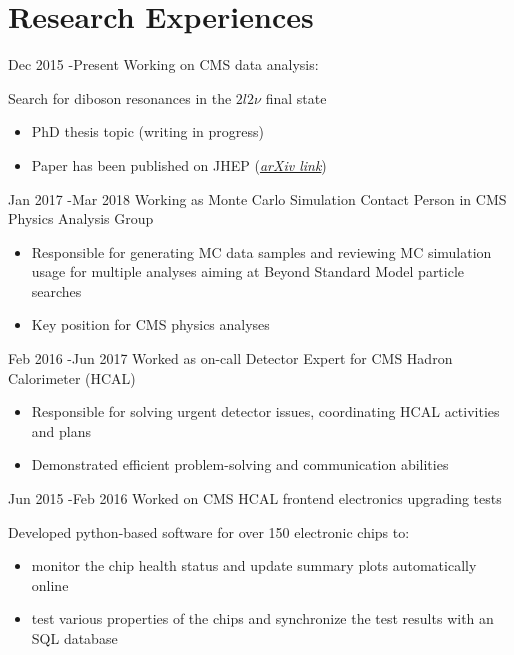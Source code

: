 \documentclass[10pt]{article} %
\begin{document}
\section{Research Experiences}
\job
{Dec 2015 -}{Present}
{Working on CMS data analysis:}
{Search for diboson resonances in the $2l2\nu$ final state
\begin{itemize}
\item PhD thesis topic (writing in progress)
\item Paper has been published on JHEP (\href{https://arxiv.org/abs/1711.04370}{\textit{arXiv link}})
\end{itemize}}
\job
{Jan 2017 -}{Mar 2018}
{Working as Monte Carlo Simulation Contact Person in CMS Physics Analysis Group}
{
\begin{itemize}
\item Responsible for generating MC data samples and reviewing MC simulation usage for multiple analyses aiming at Beyond Standard Model particle searches
\item Key position for CMS physics analyses
\end{itemize}}
\job
{Feb 2016 -}{Jun 2017}
{Worked as on-call Detector Expert for CMS Hadron Calorimeter (HCAL)}
{
\begin{itemize}
\item Responsible for solving urgent detector issues, coordinating HCAL activities and plans
\item Demonstrated efficient problem-solving and communication abilities
\end{itemize}}
\job
{Jun 2015 -}{Feb 2016}
{Worked on CMS HCAL frontend electronics upgrading tests}
{Developed python-based software for over 150 electronic chips to:
\begin{itemize}
\item monitor the chip health status and update summary plots automatically online
\item test various properties of the chips and synchronize the test results with an SQL database
\end{itemize}
}

\end{document}
